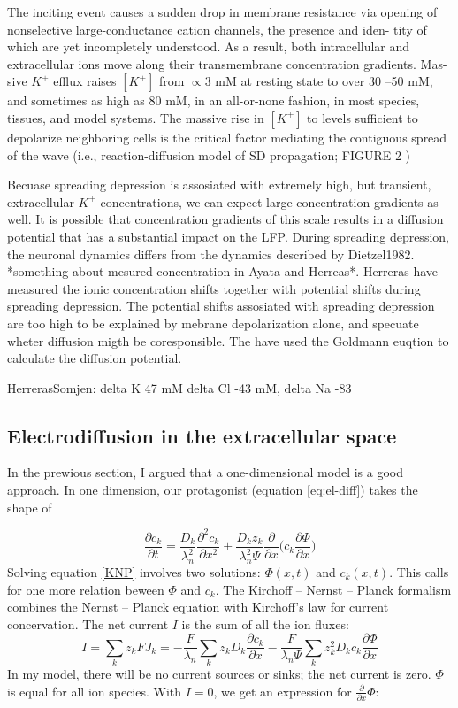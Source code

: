 \documentclass{article}
\begin{document}
The inciting event causes a sudden
drop in membrane resistance via opening of nonselective
large-conductance cation channels, the presence and iden-
tity of which are yet incompletely understood. As a result,
both intracellular and extracellular ions move along their
transmembrane concentration gradients.
Mas-
sive $K^+$ efflux raises $[K^+]$ from $ \propto 3$ mM at resting state
to over 30 –50 mM, and sometimes as
high as 80 mM, in an all-or-none fashion, in most species,
tissues, and model systems.
The massive
rise in $[K^+]$  to levels sufficient to depolarize neighboring
cells is the critical factor mediating the contiguous spread of
the wave (i.e., reaction-diffusion model of SD propagation;
FIGURE 2 )

Becuase spreading depression is assosiated with extremely high, but transient, extracellular $K^+$ concentrations, we can expect large concentration gradients as well. It is possible that concentration gradients of this scale results in a diffusion potential that has a substantial impact on the LFP. During spreading depression, the neuronal dynamics differs from the dynamics described by Dietzel1982. *something about mesured concentration in Ayata and Herreas*. Herreras have measured the ionic concentration shifts together with potential shifts during spreading depression. The potential shifts assosiated with spreading depression are too high to be explained by mebrane depolarization alone, and specuate wheter diffusion migth be coresponsible. The have used the Goldmann euqtion to calculate the diffusion potential. 

HerrerasSomjen: delta K 47 mM delta Cl -43 mM, delta Na -83 

\subsection{Electrodiffusion in the extracellular space}
In the prewious section, I argued that a one-dimensional model is a good approach. 
In one dimension, our protagonist (equation \ref{eq:el-diff}) takes the shape of 

\begin{equation}\label{KNP}
\frac{\partial c_k}{\partial t}= \frac{D_k}{\lambda_n^2} \frac{\partial^2 c_k}{\partial x^2}+\frac{D_k z_k}{\lambda_n^2 \Psi} \frac{\partial }{\partial x}  \bigg(c_k \frac{\partial \Phi}{\partial x} \bigg)
\end{equation}
Solving equation \ref{KNP} involves two solutions: $\Phi (x,t)$ and $c_k(x,t)$. This calls for one more relation beween $\Phi$ and $c_k$. The Kirchoff -- Nernst -- Planck formalism combines the Nernst -- Planck equation with Kirchoff's law for current concervation. 
The net current $I$ is the sum of all the ion fluxes:
\begin{equation}
I = \sum_{k}z_k FJ_k = -\frac{F}{\lambda_n}\sum_k z_k D_k  \frac{\partial c_k}{ \partial x} - \frac{F}{\lambda_n \Psi}\sum_k z_k^2D_k c_k \frac{\partial \Phi}{\partial x}
\end{equation}
In my model, there will be no current sources or sinks; the net current is zero. 
$\Phi$ is equal for all ion species. With $I =0$, we get an expression for $ \frac{\partial}{\partial x} \Phi$:
\end{document}
